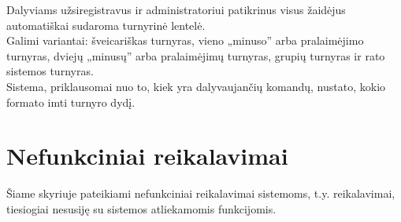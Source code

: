 \documentclass{VUMIFPSkursinis}
\begin{document}
\begin{longtabu}
    {
      Dalyviams užsiregistravus ir administratoriui patikrinus visus žaidėjus automatiškai sudaroma turnyrinė lentelė. \\
      Galimi variantai: šveicariškas turnyras, vieno „minuso” arba pralaimėjimo turnyras, dviejų „minusų” arba pralaimėjimų turnyras, 
      grupių turnyras ir rato sistemos turnyras. \\
      Sistema, priklausomai nuo to, kiek yra dalyvaujančių komandų, nustato, kokio formato imti turnyro dydį.
    }
	\end{longtabu}
	
\section{Nefunkciniai reikalavimai} \label{nefunkciniaiReikalavimai}
  Šiame skyriuje pateikiami nefunkciniai reikalavimai sistemoms, t.y. reikalavimai, tiesiogiai nesusiję su sistemos atliekamomis funkcijomis.
\end{document}
